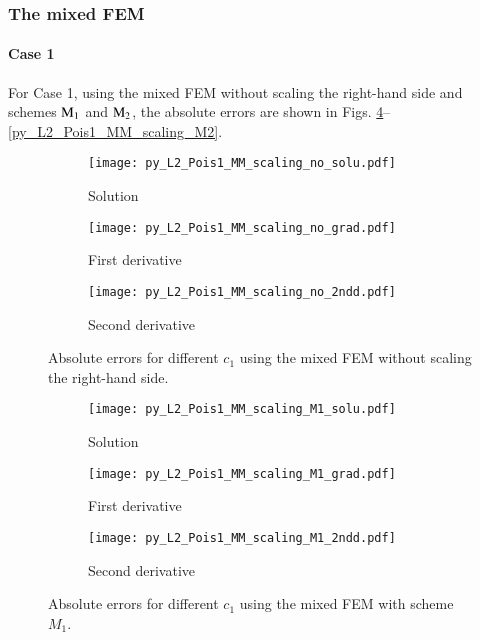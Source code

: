 \documentclass[review,3p]{elsarticle}
\begin{document}
\clearpage

\subsubsection{The mixed FEM}

\paragraph{Case 1}
For Case 1, using the mixed FEM without scaling the right-hand side and schemes ${\rm M}_1$ and ${\rm M}_2$, the absolute errors are shown in Figs. \ref{py_L2_Pois1_MM_scaling_no}--\ref{py_L2_Pois1_MM_scaling_M2}.


\begin{figure}[!ht]
    \begin{subfigure}{5.5cm}
        \texttt{[image: py\_L2\_Pois1\_MM\_scaling\_no\_solu.pdf]}
        \caption{Solution}
        \label{py_L2_Pois1_MM_scaling_no_solu}
    \end{subfigure}
    \hspace{-0.2cm}
    \begin{subfigure}{5.5cm}
        \texttt{[image: py\_L2\_Pois1\_MM\_scaling\_no\_grad.pdf]}
        \caption{First derivative}
        \label{py_L2_Pois1_MM_scaling_no_grad}
    \end{subfigure}
    \hspace{-0.2cm}
    \begin{subfigure}{5.5cm}
        \texttt{[image: py\_L2\_Pois1\_MM\_scaling\_no\_2ndd.pdf]}
        \caption{Second derivative}
        \label{py_L2_Pois1_MM_scaling_no_2ndd}
    \end{subfigure}
\caption{Absolute errors for different $c_1$ using the mixed FEM without scaling the right-hand side.}    
\label{py_L2_Pois1_MM_scaling_no}
\end{figure}

\vspace{0.0cm}
\begin{figure}[!ht]
    \begin{subfigure}{5.5cm}
        \texttt{[image: py\_L2\_Pois1\_MM\_scaling\_M1\_solu.pdf]}
        \caption{Solution}
        \label{py_L2_Pois1_MM_scaling_M1_solu}
    \end{subfigure}
    \hspace{-0.2cm}
    \begin{subfigure}{5.5cm}
        \texttt{[image: py\_L2\_Pois1\_MM\_scaling\_M1\_grad.pdf]}
        \caption{First derivative}
        \label{py_L2_Pois1_MM_scaling_M1_grad}
    \end{subfigure}
    \hspace{-0.2cm}
    \begin{subfigure}{5.5cm}
        \texttt{[image: py\_L2\_Pois1\_MM\_scaling\_M1\_2ndd.pdf]}
        \caption{Second derivative}
        \label{py_L2_Pois1_MM_scaling_M1_2ndd}
    \end{subfigure}
\caption{Absolute errors for different $c_1$ using the mixed FEM with scheme $M_1$.}    
\label{py_L2_Pois1_MM_scaling_M1}
\end{figure}
\end{document}
